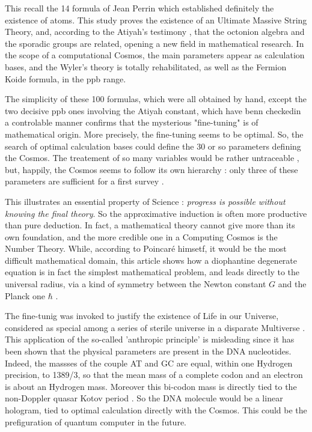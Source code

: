 \documentclass[a4paper,9pt]{article}
\begin{document}
This recall the 14 formula of Jean Perrin which established definitely the existence of atoms. This study proves the existence of an Ultimate Massive String Theory, and, according to the Atiyah's testimony \cite{Atiyah}, that the octonion algebra and the sporadic groups are related, opening a new field in mathematical research. In the scope of a computational Cosmos, the main parameters appear as calculation bases, and the Wyler's theory is totally rehabilitated, as well as the Fermion Koide formula, in the ppb range.  



The simplicity of these 100 formulas, which were all obtained by hand, except the two decisive ppb ones involving the Atiyah constant, which have benn checkedin a controlable manner \cite{LaGuer} confirms that the mysterious "fine-tuning" is of mathematical origin. More precisely, the fine-tuning seems to be optimal. So, the search of optimal calculation bases could define the 30 or so parameters defining the Cosmos. The treatement of so many variables would be rather untraceable , but, happily, the Cosmos seems to follow its own hierarchy : only three of these parameters are sufficient for a first survey \cite{Carr}. 


This illustrates an essential property of Science : \textit{progress is possible without knowing the final theory}. So the approximative induction is often more productive than pure deduction. In fact, a mathematical theory cannot give more than its own foundation, and the more credible one in a Computing Cosmos is the Number Theory. While, according to Poincar\'e himsetf, it would be the most difficult mathematical domain, this article shows how a diophantine degenerate equation is in fact the simplest mathematical problem, and leads directly to the universal radius, via a kind of symmetry between the Newton constant $G$ and the Planck one $\hbar$ .   


The fine-tunig was invoked to justify the existence of Life in our Universe, considered as special among a series of sterile universe in a disparate Multiverse \cite{Carr}. This application of the so-called 'anthropic principle' is misleading since it has been shown that the physical parameters are present in the DNA nucleotides. Indeed, the massses of the couple AT and GC are equal, within one Hydrogen precision, to 1389/3, so that the mean mass of a complete codon and an electron is about an Hydrogen mass. Moreover this bi-codon mass is directly tied to the non-Doppler quasar Kotov period \cite{Sanchez3}. So the DNA molecule would be a linear hologram, tied to optimal calculation directly with the Cosmos. This could be the prefiguration of quantum computer in the future.
\end{document}
